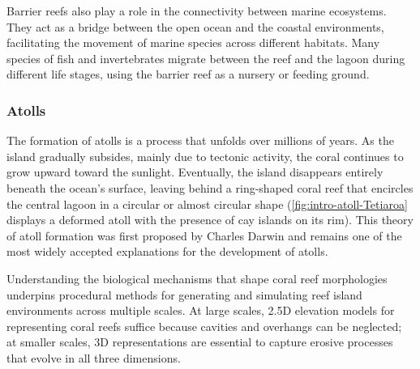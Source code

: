 Barrier reefs also play a role in the connectivity between marine ecosystems. They act as a bridge between the open ocean and the coastal environments, facilitating the movement of marine species across different habitats. Many species of fish and invertebrates migrate between the reef and the lagoon during different life stages, using the barrier reef as a nursery or feeding ground.

\subsubsection{Atolls}
The formation of atolls is a process that unfolds over millions of years. As the island gradually subsides, mainly due to tectonic activity, the coral continues to grow upward toward the sunlight. Eventually, the island disappears entirely beneath the ocean's surface, leaving behind a ring-shaped coral reef that encircles the central lagoon in a circular or almost circular shape (\cref{fig:intro-atoll-Tetiaroa} displays a deformed atoll with the presence of cay islands on its rim). This theory of atoll formation was first proposed by Charles Darwin and remains one of the most widely accepted explanations for the development of atolls.



\bigConclusion

Understanding the biological mechanisms that shape coral reef morphologies underpins procedural methods for generating and simulating reef island environments across multiple scales. At large scales, 2.5D elevation models for representing coral reefs suffice because cavities and overhangs can be neglected; at smaller scales, 3D representations are essential to capture erosive processes that evolve in all three dimensions.

